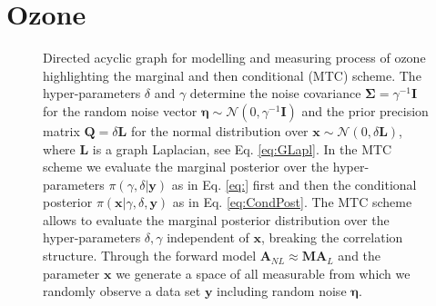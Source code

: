 \section{Ozone}
\begin{figure}[htb!]
	\centering
	\caption[Directed acyclic graph for ozone retrieval and MTC scheme.]{Directed acyclic graph for modelling and measuring process of ozone highlighting the marginal and then conditional (MTC) scheme. The hyper-parameters $\delta$ and $\gamma$ determine the noise covariance $\bm{\Sigma} = \gamma^{-1}\bm{I}$ for the random noise vector $\bm{\eta} \sim \mathcal{N}(0, \gamma^{-1}\bm{I})$ and the prior precision matrix $\bm{Q} = \delta \bm{L}$ for the normal distribution over $\bm{x} \sim \mathcal{N}(0, \delta \bm{L})$, where $\bm{L}$ is a graph Laplacian, see Eq. \ref{eq:GLapl}. In the MTC scheme we evaluate the marginal posterior over the hyper-parameters $\pi(\gamma, \delta | \bm{y})$ as in Eq. \ref{eq:} first and then the conditional posterior $\pi(\bm{x}|\gamma,\delta,\bm{y})$ as in Eq. \ref{eq:CondPost}. The MTC scheme allows to evaluate the marginal posterior distribution over the hyper-parameters $\delta, \gamma$ independent of $\bm{x}$, breaking the correlation structure.
	Through the forward model $\bm{A}_{NL} \approx \bm{M}\bm{A}_L$ and the parameter $\bm{x}$ we generate a space of all measurable from which we randomly observe a data set $\bm{y}$ including random noise $\bm{\eta}$.}
	\label{fig:DAGO3}
\end{figure}
